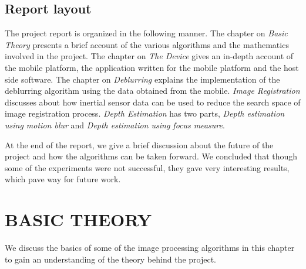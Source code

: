 \documentclass[BTech]{iitmdiss}
\begin{document}
\section{Report layout}
\label{intro:layout}
The project report is organized in the following manner. The chapter on 
\emph{Basic Theory} presents a brief account of the various algorithms
and the mathematics involved in the project. The chapter on \emph{The Device} gives an
in-depth account of the mobile platform, the application written for the
mobile platform and the host side software. The chapter on \emph{Deblurring} 
explains the implementation of the deblurring algorithm using the data
obtained from the mobile. \emph{Image Registration} discusses about how
inertial sensor data can be used to reduce the search space of image 
registration process. \emph{Depth Estimation} has two parts, 
\emph{Depth estimation using motion blur} and \emph{Depth estimation 
using focus measure}.

At the end of the report, we give a brief discussion about the future of the 
project and how the algorithms can be taken forward. We concluded that
though some of the experiments were not successful, they gave very
interesting results, which pave way for future work.

\chapter{BASIC THEORY}
\label{chap:basic_theory}
We discuss the basics of some of the image processing algorithms in this
chapter to gain an understanding of the theory behind the project.
\end{document}
